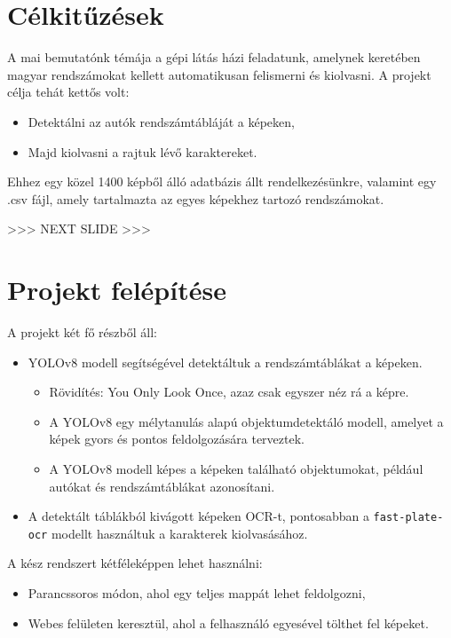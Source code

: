 \documentclass[12pt]{article}
\begin{document}
\section*{Célkitűzések}

A mai bemutatónk témája a gépi látás házi feladatunk, amelynek keretében magyar rendszámokat kellett automatikusan felismerni és kiolvasni.
A projekt célja tehát kettős volt:
\begin{itemize}[noitemsep]
	\item Detektálni az autók rendszámtábláját a képeken,
	\item Majd kiolvasni a rajtuk lévő karaktereket.
\end{itemize}

Ehhez egy közel 1400 képből álló adatbázis állt rendelkezésünkre, valamint egy .csv fájl, amely tartalmazta az egyes képekhez tartozó rendszámokat.

>>> NEXT SLIDE >>>

\section*{Projekt felépítése}

A projekt két fő részből áll:

\begin{itemize}[noitemsep]
	\item YOLOv8 modell segítségével detektáltuk a rendszámtáblákat a képeken.
	      \begin{itemize}
		      \item Rövidítés: You Only Look Once, azaz csak egyszer néz rá a képre.
		      \item A YOLOv8 egy mélytanulás alapú objektumdetektáló modell, amelyet a
		            képek gyors és pontos feldolgozására terveztek.
		      \item A YOLOv8 modell képes a képeken található objektumokat, például
		            autókat és rendszámtáblákat azonosítani.
	      \end{itemize}
	\item A detektált táblákból kivágott képeken OCR-t, pontosabban a \texttt{fast-plate-ocr} modellt használtuk a karakterek kiolvasásához.
\end{itemize}

A kész rendszert kétféleképpen lehet használni:
\begin{itemize}[noitemsep]
	\item Parancssoros módon, ahol egy teljes mappát lehet feldolgozni,
	\item Webes felületen keresztül, ahol a felhasználó egyesével tölthet fel képeket.
\end{itemize}
\end{document}
